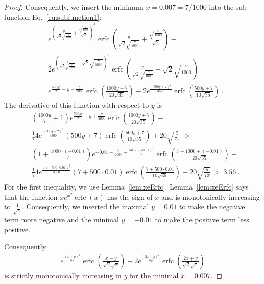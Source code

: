 \documentclass{article}
\DeclareMathOperator{\erfc}{erfc}
\begin{document}
\begin{proof}
Consequently, we insert the minimum $x=0.007=7/1000$ into the sub-function
Eq.~\eqref{eq:subfunction1}:
\begin{align}
&e^{\left(\frac{y}{\sqrt{2} \sqrt{\frac{7}{1000}}}+\frac{\sqrt{\frac{7}{1000}}}{\sqrt{2}}\right)^2} \erfc \left(\frac{y}{\sqrt{2} \sqrt{\frac{7}{1000}}}+\frac{\sqrt{\frac{7}{1000}}}{\sqrt{2}}\right)- \\ \nonumber &2 e^{\left(\frac{y}{\sqrt{2} \sqrt{\frac{7}{1000}}}+\sqrt{2} \sqrt{\frac{7}{1000}}\right)^2} \erfc \left(\frac{y}{\sqrt{2} \sqrt{\frac{7}{1000}}}+\sqrt{2} \sqrt{\frac{7}{1000}}\right)\ = \\ \nonumber &e^{\frac{500 y^2}{7}+y+\frac{7}{2000}} \erfc \left(\frac{1000 y+7}{20 \sqrt{35}}\right)-2 e^{\frac{(500 y+7)^2}{3500}} \erfc \left(\frac{500 y+7}{10 \sqrt{35}}\right) \ .
\end{align}
The derivative of this function with respect to $y$ is
\begin{align}
&\left(\frac{1000 y}{7}+1\right) e^{\frac{500 y^2}{7}+y+\frac{7}{2000}} \erfc \left(\frac{1000 y+7}{20 \sqrt{35}}\right)- \\ \nonumber &\frac{1}{7} 4 e^{\frac{(500 y+7)^2}{3500}} (500 y+7) \erfc \left(\frac{500 y+7}{10 \sqrt{35}}\right)+20 \sqrt{\frac{5}{7 \pi }}\ > \\ \nonumber&\left(1+\frac{1000 \cdot (-0.01)}{7}\right) e^{-0.01 +\frac{7}{2000}+\frac{500 \cdot (-0.01)^2}{7}} \erfc \left(\frac{7+1000+(-0.01)}{20 \sqrt{35}}\right)- \\ \nonumber &\frac{1}{7} 4 e^{\frac{(7+500 \cdot 0.01)^2}{3500}} (7+500 \cdot 0.01) \erfc \left(\frac{7+500 \cdot 0.01}{10 \sqrt{35}}\right)+20 \sqrt{\frac{5}{7 \pi }}\ >\ 3.56\ .
\end{align}
For the first inequality, we use Lemma~\ref{lem:xeErfc}.
Lemma~\ref{lem:xeErfc} says that 
the function $x e^{x^2}\erfc (x) $ has the sign of $x$ and is
monotonically increasing to $\frac {1} {\sqrt {\pi}} $.
Consequently, we inserted the maximal $y=0.01$ to
make the negative term more negative and the minimal $y=-0.01$
to make the positive term less positive.


Consequently 
\begin{align}
e^{\frac{(x+y)^2}{2 x}} \erfc \left(\frac{x+y}{\sqrt{2} \sqrt{x}}\right)-2 e^{\frac{(2 x+y)^2}{2 x}} \erfc \left(\frac{2 x+y}{\sqrt{2} \sqrt{x}}\right)
\end{align}
is strictly monotonically increasing in $y$ for the minimal
$x=0.007$. 



\end{proof}
\end{document}
